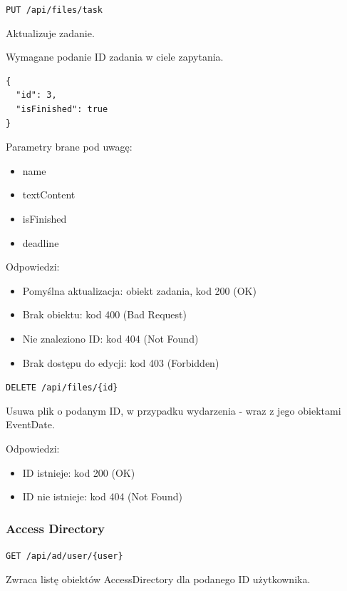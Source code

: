 \documentclass[a4paper,twoside,12pt]{book}
\begin{document}
\label{update-task}

\texttt{PUT\ /api/files/task}

Aktualizuje zadanie.

Wymagane podanie ID zadania w ciele zapytania.

\begin{verbatim}
{
  "id": 3,
  "isFinished": true
}
\end{verbatim}

Parametry brane pod uwagę: 
\begin{itemize}
	\item  name \item  textContent \item  isFinished \item  deadline
\end{itemize}

Odpowiedzi: 
\begin{itemize}
	\item Pomyślna aktualizacja: obiekt zadania, kod 200 (OK) 
	\item Brak obiektu: kod 400 (Bad Request) 
	\item Nie znaleziono ID: kod 404 (Not Found)
	\item Brak dostępu do edycji: kod 403 (Forbidden)
\end{itemize}

\label{delete-file}

\texttt{DELETE\ /api/files/\{id\}}

Usuwa plik o podanym ID, w przypadku wydarzenia - wraz z jego obiektami EventDate.

Odpowiedzi: 
\begin{itemize}
	\item ID istnieje: kod 200 (OK) 
	\item ID nie istnieje: kod 404 (Not Found)
\end{itemize}

\subsubsection{Access Directory}\label{access-directory}

\label{get-accessdirectory-by-user}

\texttt{GET\ /api/ad/user/\{user\}}

Zwraca listę obiektów AccessDirectory dla podanego ID użytkownika.
\end{document}
